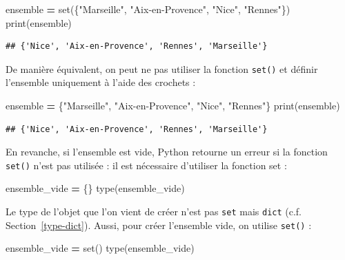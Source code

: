\documentclass[12pt,]{book}
\newenvironment{Shaded}{\begin{snugshade}}{\end{snugshade}}
\newcommand{\StringTok}[1]{\textcolor[rgb]{0.31,0.60,0.02}{#1}}
\newcommand{\OperatorTok}[1]{\textcolor[rgb]{0.81,0.36,0.00}{\textbf{#1}}}
\newcommand{\BuiltInTok}[1]{#1}
\newcommand{\NormalTok}[1]{#1}
\numberwithin{equation}{section}
\numberwithin{countremarque}{section}
\begin{document}
\begin{Shaded}
\begin{Highlighting}[]
\NormalTok{ensemble }\OperatorTok{=} \BuiltInTok{set}\NormalTok{(\{}\StringTok{"Marseille"}\NormalTok{, }\StringTok{"Aix-en-Provence"}\NormalTok{, }\StringTok{"Nice"}\NormalTok{, }\StringTok{"Rennes"}\NormalTok{\})}
\BuiltInTok{print}\NormalTok{(ensemble)}
\end{Highlighting}
\end{Shaded}

\begin{lstlisting}
## {'Nice', 'Aix-en-Provence', 'Rennes', 'Marseille'}
\end{lstlisting}

De manière équivalent, on peut ne pas utiliser la fonction
\texttt{set()} et définir l'ensemble uniquement à l'aide des crochets :

\begin{Shaded}
\begin{Highlighting}[]
\NormalTok{ensemble }\OperatorTok{=}\NormalTok{ \{}\StringTok{"Marseille"}\NormalTok{, }\StringTok{"Aix-en-Provence"}\NormalTok{, }\StringTok{"Nice"}\NormalTok{, }\StringTok{"Rennes"}\NormalTok{\}}
\BuiltInTok{print}\NormalTok{(ensemble)}
\end{Highlighting}
\end{Shaded}

\begin{lstlisting}
## {'Nice', 'Aix-en-Provence', 'Rennes', 'Marseille'}
\end{lstlisting}

En revanche, si l'ensemble est vide, Python retourne un erreur si la
fonction \texttt{set()} n'est pas utilisée : il est nécessaire
d'utiliser la fonction set :

\begin{Shaded}
\begin{Highlighting}[]
\NormalTok{ensemble_vide }\OperatorTok{=}\NormalTok{ \{\}}
\BuiltInTok{type}\NormalTok{(ensemble_vide)}
\end{Highlighting}
\end{Shaded}

Le type de l'objet que l'on vient de créer n'est pas \texttt{set} mais
\texttt{dict} (c.f. Section~\ref{type-dict}). Aussi, pour créer
l'ensemble vide, on utilise \texttt{set()} :

\begin{Shaded}
\begin{Highlighting}[]
\NormalTok{ensemble_vide }\OperatorTok{=} \BuiltInTok{set}\NormalTok{()}
\BuiltInTok{type}\NormalTok{(ensemble_vide)}
\end{Highlighting}
\end{Shaded}
\end{document}
